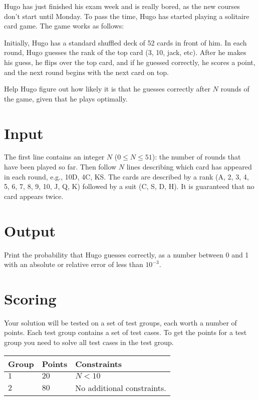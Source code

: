 Hugo has just finished his exam week and is really bored, as the new courses don't start until Monday.
To pass the time, Hugo has started playing a solitaire card game. The game works as follows:

Initially, Hugo has a standard shuffled deck of 52 cards in front of him. In each round, Hugo guesses the rank of the top card (3, 10, jack, etc).
After he makes his guess, he flips over the top card, and if he guessed correctly, he scores a point, and the next round begins with the next card on top.

Help Hugo figure out how likely it is that he guesses correctly after $N$ rounds of the game, given that he plays optimally.

\section*{Input}
The first line contains an integer $N$ ($0 \le N \le 51$): the number of rounds that have been played so far.
Then follow $N$ lines describing which card has appeared in each round, e.g., 10D, 4C, KS.
The cards are described by a rank (A, 2, 3, 4, 5, 6, 7, 8, 9, 10, J, Q, K) followed by a suit (C, S, D, H).
It is guaranteed that no card appears twice.

\section*{Output}
Print the probability that Hugo guesses correctly, as a number between 0 and 1 with an absolute or relative error of less than $10^{-3}$.

\section*{Scoring}
Your solution will be tested on a set of test groups, each worth a number of points. Each test group contains
a set of test cases. To get the points for a test group you need to solve all test cases in the test group.

\noindent
\begin{tabular}{| l | l | p{12cm} |}
  \hline
  \textbf{Group} & \textbf{Points} & \textbf{Constraints} \\ \hline
  $1$    & $20$       & $N < 10$ \\ \hline
  $2$    & $80$       & No additional constraints. \\ \hline
\end{tabular}
